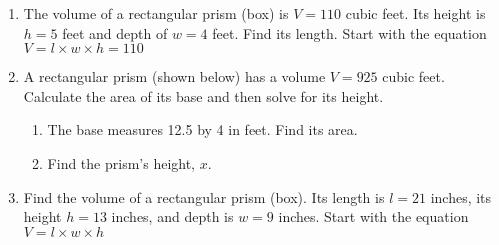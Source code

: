 \begin{enumerate}
\item The volume of a rectangular prism (box) is $V=110$ cubic feet. Its height is $h=5$ feet and depth of $w=4$ feet. Find its length. Start with the equation \\[0.5cm]
$V = l \times w \times h = 110$
  \begin{flushright}
  \end{flushright}

\item A rectangular prism (shown below) has a volume $V=925$ cubic feet. Calculate the area of its base and then solve for its height.
\begin{multicols}{2}
\begin{enumerate}
  \item The base measures 12.5 by 4 in feet. Find its area.
  \item Find the prism's height, $x$. \vspace{2cm}
\end{enumerate}
  \begin{flushright}
  \end{flushright}
\end{multicols}

\item Find the volume of a rectangular prism (box). Its length is $l=21$ inches, its height $h=13$ inches, and depth is $w=9$ inches. Start with the equation \\[0.5cm]
$V = l \times w \times h$
  \begin{flushright}
  \end{flushright}


\end{enumerate}
